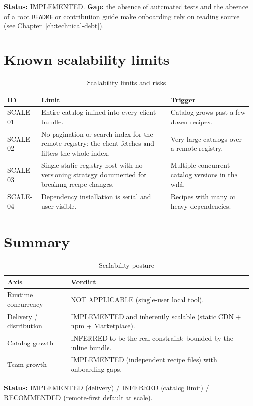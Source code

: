\textbf{Status:} IMPLEMENTED. \textbf{Gap:} the absence of automated tests and
the absence of a root \texttt{README} or contribution guide make onboarding
rely on reading source (see Chapter~\ref{ch:technical-debt}).

\section{Known scalability limits}

\begin{longtable}{p{1.5cm}p{9.3cm}p{3.3cm}}
\caption{Scalability limits and risks}\\
\toprule
\textbf{ID} & \textbf{Limit} & \textbf{Trigger} \\
\midrule

SCALE-01 & Entire catalog inlined into every client bundle. & Catalog grows past
a few dozen recipes. \\
SCALE-02 & No pagination or search index for the remote registry; the client
fetches and filters the whole index. & Very large catalogs over a remote
registry. \\
SCALE-03 & Single static registry host with no versioning strategy documented for
breaking recipe changes. & Multiple concurrent catalog versions in the wild. \\
SCALE-04 & Dependency installation is serial and user-visible. & Recipes with many
or heavy dependencies. \\
\bottomrule
\end{longtable}

\section{Summary}

\begin{table}[H]
\centering
\caption{Scalability posture}
\begin{tabular}{p{4.4cm}p{9.8cm}}
\toprule
\textbf{Axis} & \textbf{Verdict} \\
\midrule
Runtime concurrency & NOT APPLICABLE (single-user local tool). \\
Delivery / distribution & IMPLEMENTED and inherently scalable (static CDN + npm +
Marketplace). \\
Catalog growth & INFERRED to be the real constraint; bounded by the inline
bundle. \\
Team growth & IMPLEMENTED (independent recipe files) with onboarding gaps. \\
\bottomrule
\end{tabular}
\end{table}

\textbf{Status:} IMPLEMENTED (delivery) / INFERRED (catalog limit) / RECOMMENDED
(remote-first default at scale).
